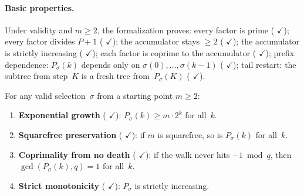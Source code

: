 \paragraph{Basic properties.}
Under validity and $m \geq 2$, the formalization proves:
every factor is prime
(
{\color{leanink}$\checkmark$});
every factor divides $P{+}1$
(
{\color{leanink}$\checkmark$});
the accumulator stays $\geq 2$
(
{\color{leanink}$\checkmark$});
the accumulator is strictly increasing
(
{\color{leanink}$\checkmark$});
each factor is coprime to the accumulator
(
{\color{leanink}$\checkmark$});
prefix dependence: $P_\sigma(k)$ depends only on $\sigma(0),\ldots,\sigma(k{-}1)$
(
{\color{leanink}$\checkmark$});
tail restart: the subtree from step~$K$ is a fresh tree from~$P_\sigma(K)$
(
{\color{leanink}$\checkmark$}).

\begin{theorem}
\label{thm:mixed-walk-structure}
For any valid selection~$\sigma$ from a starting point $m \geq 2$:
\begin{enumerate}[nosep]
\item \textbf{Exponential growth}
  (
  {\color{leanink}$\checkmark$}):
  $P_\sigma(k) \geq m \cdot 2^k$ for all~$k$.
\item \textbf{Squarefree preservation}
  (
  {\color{leanink}$\checkmark$}):
  if $m$ is squarefree, so is $P_\sigma(k)$ for all~$k$.
\item \textbf{Coprimality from no death}
  (
  {\color{leanink}$\checkmark$}):
  if the walk never hits $-1 \bmod q$, then $\gcd(P_\sigma(k), q) = 1$ for all~$k$.
\item \textbf{Strict monotonicity}
  (
  {\color{leanink}$\checkmark$}):
  $P_\sigma$ is strictly increasing.
\end{enumerate}
\end{theorem}

